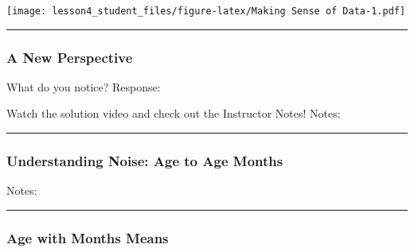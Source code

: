 \documentclass[]{article}
\newenvironment{Shaded}{\begin{snugshade}}{\end{snugshade}}
\newcommand{\KeywordTok}[1]{\textcolor[rgb]{0.13,0.29,0.53}{\textbf{#1}}}
\newcommand{\DataTypeTok}[1]{\textcolor[rgb]{0.13,0.29,0.53}{#1}}
\newcommand{\DecValTok}[1]{\textcolor[rgb]{0.00,0.00,0.81}{#1}}
\newcommand{\StringTok}[1]{\textcolor[rgb]{0.31,0.60,0.02}{#1}}
\newcommand{\OperatorTok}[1]{\textcolor[rgb]{0.81,0.36,0.00}{\textbf{#1}}}
\newcommand{\NormalTok}[1]{#1}
\begin{document}
\texttt{[image: lesson4\_student\_files/figure-latex/Making Sense of Data-1.pdf]}

\begin{center}\rule{0.5\linewidth}{\linethickness}\end{center}

\subsubsection{A New Perspective}\label{a-new-perspective}

What do you notice? Response:

Watch the solution video and check out the Instructor Notes! Notes:

\begin{center}\rule{0.5\linewidth}{\linethickness}\end{center}

\subsubsection{Understanding Noise: Age to Age
Months}\label{understanding-noise-age-to-age-months}

Notes:

\begin{Shaded}
\end{Shaded}

\begin{center}\rule{0.5\linewidth}{\linethickness}\end{center}

\subsubsection{Age with Months Means}\label{age-with-months-means}

\begin{Shaded}
\end{Shaded}
\end{document}
